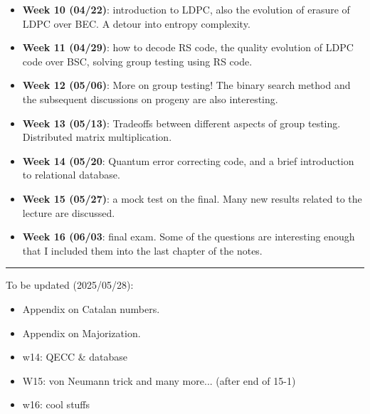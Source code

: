 \begin{itemize}
    \item \textbf{Week 10 (04/22)}: introduction to LDPC, also the evolution of erasure of LDPC over BEC. A detour into entropy complexity.
    \item \textbf{Week 11 (04/29)}: how to decode RS code, the quality evolution of LDPC code over BSC, solving group testing using RS code.
    \item \textbf{Week 12 (05/06)}: More on group testing! The binary search method and the subsequent discussions on progeny are also interesting.
    \item \textbf{Week 13 (05/13)}: Tradeoffs between different aspects of group testing. Distributed matrix multiplication.
    \item \textbf{Week 14 (05/20}: Quantum error correcting code, and a brief introduction to relational database.
    \item \textbf{Week 15 (05/27)}: a mock test on the final. Many new results related to the lecture are discussed.
    \item \textbf{Week 16 (06/03}: final exam. Some of the questions are interesting enough that I included them into the last chapter of the notes.
\end{itemize}

\vspace{1cm}
\hrule
To be updated (2025/05/28):
\begin{itemize}
    \item Appendix on Catalan numbers.
    \item Appendix on Majorization.
    \item w14: QECC \& database
    \item W15: von Neumann trick and many more... (after end of 15-1)
    \item w16: cool stuffs
\end{itemize}